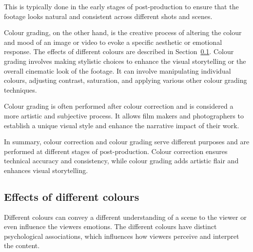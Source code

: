 \documentclass[../MasterThesis.tex]{subfiles}
\begin{document}
This is typically done in the early stages of post-production to ensure that the footage looks natural and consistent across different shots and scenes.~\cite{cc1}


Colour grading, on the other hand, is the creative process of altering the colour and mood of an image or video to evoke a specific aesthetic or emotional response. The effects of different colours are described in Section~\ref{subsection:effectsofdifferentcolours}.
Colour grading involves making stylistic choices to enhance the visual storytelling or the overall cinematic look of the footage. It can involve manipulating individual colours, adjusting contrast, saturation, and applying various other colour grading techniques.~\cite{cc_cg_1, cc_cg_2}

Colour grading is often performed after colour correction and is considered a more artistic and subjective process. It allows film makers and photographers to establish a unique visual style and enhance the narrative impact of their work.~\cite{cc_cg_1, cc_cg_2}


In summary, colour correction and colour grading serve different purposes and are performed at different stages of post-production. Colour correction ensures technical accuracy and consistency, while colour grading adds artistic flair and enhances visual storytelling.~\cite{cc1, cc_cg_1, cc_cg_2}


















\newpage
\subsection{Effects of different colours} 
\label{subsection:effectsofdifferentcolours}

Different colours can convey a different understanding of a scene to the viewer or even influence the viewers emotions. 
The different colours have distinct psychological associations, which influences how viewers perceive and interpret the content.~\cite{colour}
\end{document}
